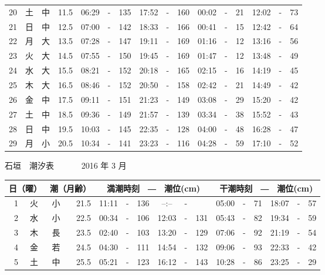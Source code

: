 \documentclass[12pt.a4j]{jsarticle}
\begin{document}
\begin{center}
\begin{table}[ht]
\begin{tabular}{|rc|cr|ccrccr|ccrccr|}
20 & 土 & 中 & 11.5 &  06:29 &-& 135  &  17:52 &-& 160  &   00:02 &-&  21  &   12:02 &-&  73  \\
21 & 日 & 中 & 12.5 &  07:00 &-& 142  &  18:33 &-& 166  &   00:41 &-&  15  &   12:42 &-&  64  \\
22 & 月 & 大 & 13.5 &  07:28 &-& 147  &  19:11 &-& 169  &   01:16 &-&  12  &   13:16 &-&  56  \\
23 & 火 & 大 & 14.5 &  07:55 &-& 150  &  19:45 &-& 169  &   01:47 &-&  12  &   13:48 &-&  49  \\
24 & 水 & 大 & 15.5 &  08:21 &-& 152  &  20:18 &-& 165  &   02:15 &-&  16  &   14:19 &-&  45  \\
25 & 木 & 大 & 16.5 &  08:46 &-& 152  &  20:50 &-& 158  &   02:42 &-&  21  &   14:49 &-&  42  \\
26 & 金 & 中 & 17.5 &  09:11 &-& 151  &  21:23 &-& 149  &   03:08 &-&  29  &   15:20 &-&  42  \\
27 & 土 & 中 & 18.5 &  09:36 &-& 149  &  21:57 &-& 139  &   03:34 &-&  38  &   15:52 &-&  43  \\
28 & 日 & 中 & 19.5 &  10:03 &-& 145  &  22:35 &-& 128  &   04:00 &-&  48  &   16:28 &-&  47  \\
29 & 月 & 小 & 20.5 &  10:34 &-& 141  &  23:23 &-& 116  &   04:28 &-&  59  &   17:10 &-&  52  \\
   \hline
   \end{tabular}
\end{table}
\newpage
 {\LARGE 石垣　潮汐表　　　}
 {\large 2016 年  3 月}\\
 \begin{table}[ht]
    \begin{tabular}{|rc|cr|ccrccr|ccrccr|}
    \hline
    \multicolumn{2}{|c|}{日（曜）} & \multicolumn{2}{c|}{潮（月齢）} & \multicolumn{6}{c|}{満潮時刻　―　潮位(cm)} & \multicolumn{6}{c|}{干潮時刻　―　潮位(cm)} \\
 \hline
 1 & 火 & 小 & 21.5 &  11:11 &-& 136  &  --:-- &-&     &   05:00 &-&  71  &   18:07 &-&  57  \\
 2 & 水 & 小 & 22.5 &  00:34 &-& 106  &  12:03 &-& 131  &   05:43 &-&  82  &   19:34 &-&  59  \\
 3 & 木 & 長 & 23.5 &  02:40 &-& 103  &  13:20 &-& 129  &   07:06 &-&  92  &   21:19 &-&  54  \\
 4 & 金 & 若 & 24.5 &  04:30 &-& 111  &  14:54 &-& 132  &   09:06 &-&  93  &   22:33 &-&  42  \\
 5 & 土 & 中 & 25.5 &  05:21 &-& 123  &  16:12 &-& 143  &   10:28 &-&  86  &   23:25 &-&  29  \\

\end{tabular}
\end{table}
\end{center}
\end{document}
